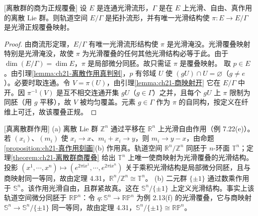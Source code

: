 \documentclass[../../main.tex]{subfiles}
\begin{document}
\begin{theorem}{[离散群的商为正规覆叠]}\label{theorem:ch21-离散群商覆叠}
设 $E$ 是连通光滑流形，$\Gamma$ 是在 $E$ 上光滑、自由、真作用的离散 Lie 群。则轨道空间 $E/\Gamma$ 是拓扑流形，并有唯一光滑结构使 $\pi\colon E\to E/\Gamma$ 是光滑正规覆叠映射。
\end{theorem}

\begin{proof}
由商流形定理，$E/\Gamma$ 有唯一光滑流形结构使 $\pi$ 是光滑淹没。光滑覆叠映射特别是光滑淹没，故使 $\pi$ 为光滑覆叠的任何其他光滑结构必等于此。由于 $\dim(E/\Gamma)=\dim E$，$\pi$ 是局部微分同胚。故只需证 $\pi$ 是覆叠映射。
取 $p\in E$。由引理\cref{lemma:ch21-离散作用真判别}，$p$ 有邻域 $U$ 使 $(gU)\cap U=\varnothing$（$g\neq e$）。必要时取连通。令 $V=\pi(U)$，由引理\cref{lemma:ch21-商映射开} 它在 $E/\Gamma$ 中开。因 $\pi^{-1}(V)$ 是互不相交连通开集 $gU$（$g\in\Gamma$）之并，且每个 $gU$ 上 $\pi$ 限制为同胚（用 $g$ 平移），故 $V$ 被均匀覆盖。元素 $g\in\Gamma$ 作为 $\pi$ 的自同构，按定义在纤维上可迁，故该覆叠正规。
\end{proof}

\begin{example}{[真离散群作用]}\label{example:ch21-真离散作用}
(a) 离散 Lie 群 $\mathbb{Z}^n$ 通过平移在 $\mathbb{R}^n$ 上光滑自由作用（例 7.22(e)）。若 $(x_i)$、$(m_i)$ 使 $x_i\to x$、$m_i+x_i\to y$，则 $m_i\to y-x$，由命题\cref{proposition:ch21-真作用刻画}(b) 作用真。轨道空间 $\mathbb{R}^n/\mathbb{Z}^n$ 同胚于 $n$-环面 $\mathbb{T}^n$；定理\cref{theorem:ch21-离散群商覆叠} 给出 $\mathbb{T}^n$ 上唯一使商映射为光滑覆叠的光滑结构。投影 $(x^1,\cdots ,x^n)\mapsto(e^{2\pi\mathrm{i}x^1},\cdots ,e^{2\pi\mathrm{i}x^n})$ 关于乘积光滑结构是局部微分同胚，且与商映射同一等同，故由定理 4.31，$\mathbb{R}^n/\mathbb{Z}^n\cong\mathbb{T}^n$。
(b) 二元群 $\{\pm1\}$ 通过数乘作用于 $\mathbb{S}^n$。该作用光滑自由，且群紧故真。这在 $\mathbb{S}^n/\{\pm1\}$ 上定义光滑结构。事实上该轨道空间微分同胚于 $\mathbb{RP}^n$：令 $q\colon\mathbb{S}^n\to\mathbb{RP}^n$ 为例 2.13(f) 的光滑覆叠，它与商映射 $\mathbb{S}^n\to\mathbb{S}^n/\{\pm1\}$ 同一等同，故由定理 4.31，$\mathbb{S}^n/\{\pm1\}\cong\mathbb{RP}^n$。
\end{example}
\end{document}
